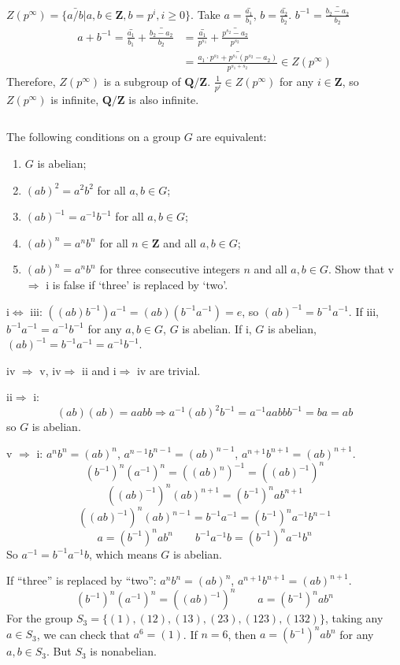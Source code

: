\begin{answer}
    $Z(p^\infty)=\{\bar{a/b}|a, b\in\mathbf{Z}, b=p^i, i\geq 0 \}$. Take $a=\bar{\frac{a_1}{b_1}}$, $b=\bar{\frac{a_2}{b_2}}$. $b^{-1}=\bar{\frac{b_2-a_2}{b_2}}$
    \[\begin{aligned}
        a+b^{-1}=\bar{\frac{a_1}{b_1}}+\bar{\frac{b_2-a_2}{b_2}}&=\bar{\frac{a_1}{p^{s_1}}}+\bar{\frac{p^{s_2}-a_2}{p^{s_2}}}\\ &=\bar{\frac{a_1\cdot p^{s_2}+p^{s_1}(p^{s_2}-a_2)}{p^{s_1+s_2}}}\in Z(p^\infty)
    \end{aligned}\]
    Therefore, $Z(p^\infty)$ is a subgroup of $\mathbf{Q}/\mathbf{Z}$. $\frac{1}{p^i}\in Z(p^\infty)$ for any $i \in \mathbf{Z}$, so $Z(p^\infty)$ is infinite, $\mathbf{Q}/\mathbf{Z}$ is also infinite.
\end{answer}

$$ $$

\begin{ex}
    The following conditions on a group $G$ are equivalent:
    \begin{enumerate}[i]
        \item $G$ is abelian;
        \item $(ab)^2=a^{2}b^{2}$ for all $a,b\in G$;
        \item $(ab)^{-1}=a^{-1}b^{-1}$ for all $a,b \in G$;
        \item $(ab)^{n}=a^{n}b^{n}$ for all $n\in \mathbf{Z}$ and all $a,b \in G$;
        \item $(ab)^{n}=a^{n}b^{n}$ for three consecutive integers $n$ and all $a,b \in G$. Show that v$\Rightarrow$ i is false if `three' is replaced by `two'.
    \end{enumerate}
\end{ex}

\begin{answer}
    i$\Leftrightarrow$ iii: $((ab)b^{-1})a^{-1}=(ab)(b^{-1}a^{-1})=e$, so $(ab)^{-1}=b^{-1}a^{-1}$. If iii, $b^{-1}a^{-1}=a^{-1}b^{-1}$ for any $a,b \in G$, $G$ is abelian. If i, $G$ is abelian, $(ab)^{-1}=b^{-1}a^{-1}=a^{-1}b^{-1}$.

    iv $\Rightarrow$ v, iv$\Rightarrow$ ii and i$\Rightarrow$ iv are trivial.

    ii$\Rightarrow$ i: \[(ab)(ab)=aabb\Rightarrow a^{-1}(ab)^{2}b^{-1}=a^{-1}aabbb^{-1}=ba=ab\] so $G$ is abelian.

    v $\Rightarrow$ i: $a^{n}b^{n}=(ab)^{n}$, $a^{n-1}b^{n-1}=(ab)^{n-1}$, $a^{n+1}b^{n+1}=(ab)^{n+1}$. \[(b^{-1})^{n}(a^{-1})^{n}=((ab)^{n})^{-1}=((ab)^{-1})^{n}\]\[((ab)^{-1})^{n}(ab)^{n+1}=(b^{-1})^{n}ab^{n+1}\]\[((ab)^{-1})^{n}(ab)^{n-1}=b^{-1}a^{-1}=(b^{-1})^{n}a^{-1}b^{n-1}\]\[a=(b^{-1})^{n}ab^{n}\qquad b^{-1}a^{-1}b=(b^{-1})^{n}a^{-1}b^{n}\]So $a^{-1}=b^{-1}a^{-1}b$, which means $G $ is abelian.

    If ``three'' is replaced by ``two'': $a^{n}b^{n}=(ab)^{n}$, $a^{n+1}b^{n+1}=(ab)^{n+1}$. \[(b^{-1})^{n}(a^{-1})^{n}=((ab)^{-1})^{n}\qquad a=(b^{-1})^{n}ab^{n}\] 
    For the group $S_3=\{(1),(12),(13),(23),(123),(132)\}$, taking any $a\in S_3$, we can check that $a^{6}=(1)$. If $n=6$, then $a=(b^{-1})^{n}ab^{n}$ for any $a,b \in S_3$. But $S_3$ is nonabelian.
\end{answer}

